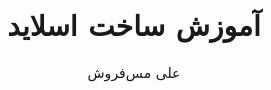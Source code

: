 \documentclass[xcolor=dvipsnames, professionalfont]{beamer}
\author{علی مس‌فروش}
\title{آموزش ساخت اسلاید}
\institute{دانشگاه صنعتی شاهرود}
\begin{document}
\frame{\maketitle}

\begin{frame}


\end{frame}
\end{document}

